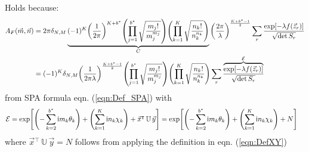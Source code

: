 \documentclass[
	english,
	a4paper,
	fontsize=10pt,
	parskip=half,
	titlepage=true,
	DIV=12,
	final
]{scrreprt}
\newcommand*{\transp}{\ensuremath{^\intercal}}
\newcommand*{\iunit}{\ensuremath{\mathrm{i}}}
\begin{document}
Holds because:
\begin{align}
	A_F(\vec{m}, \vec{n})
&=
	2\pi \delta_{N,M}
	\underbrace{
		(-1)^K 
		\qty(
			\frac{1}{2\pi}
		)^{K + b^*}
		\qty( \prod_{j=1}^{b^*}
			\sqrt{\frac
				{ m_j! }
				{ m_j^{m_j} }
			}
		)
		\qty( \prod_{k=1}^{K}
			\sqrt{\frac
				{ n_k! }
				{ n_k^{n_k} }
			}
		)
	}_{C}
	\qty(
		\frac{2\pi}{\lambda}
	)^{\frac{K + b^* - 1}{2}}
	\sum_r
		\frac
			{\exp[-\lambda f(\vec{z}_r)]}
			{\sqrt{\det S_r}} \\
&=
	(-1)^K \delta_{N,M} \qty(
		\frac{1}{2\pi\lambda}
	)^{\frac{K + b^* - 1}{2}}
	\qty( \prod_{j=1}^{b^*}
		\sqrt{\frac
			{ m_j! }
			{ m_j^{m_j} }
		}
	)
	\qty( \prod_{k=1}^{K}
		\sqrt{\frac
			{ n_k! }
			{ n_k^{n_k} }
		}
	)
	\sum_r
		\frac
		{\overbrace{
			\exp[-\lambda f(\vec{z}_r)]
		}^{\mathcal{E}}}
		{\sqrt{\det S_r}}
\end{align}
from SPA formula eqn. (\ref{eqn:Def_SPA}) with
\begin{align}
	\mathcal{E}
&=
	\exp[ 
		\qty(- \sum_{k=2}^{b^*} \iunit m_k \theta_k) + 
		\qty(  \sum_{k=1}^{K}   \iunit n_k \chi  _k)   +
		\vec{x}\transp \, \mathbb{U} \, \vec{y}
	]
=
	\exp[ 
		\qty(- \sum_{k=2}^{b^*} \iunit m_k \theta_k) + 
		\qty(  \sum_{k=1}^{K}   \iunit n_k \chi  _k)   +
		N
	]
\end{align}
where $\vec{x}\transp \, \mathbb{U} \, \vec{y} = N$ follows from applying the definition in eqn. (\ref{eqn:DefXY})
\end{document}
